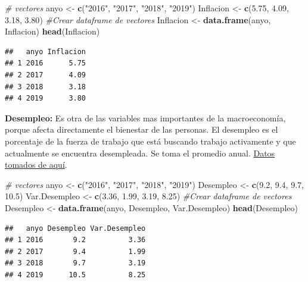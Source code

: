 \documentclass[
  11pt,
  a4paper,
]{book}
\newenvironment{Shaded}{\begin{snugshade}}{\end{snugshade}}
\newcommand{\CommentTok}[1]{\textcolor[rgb]{0.56,0.35,0.01}{\textit{#1}}}
\newcommand{\FloatTok}[1]{\textcolor[rgb]{0.00,0.00,0.81}{#1}}
\newcommand{\KeywordTok}[1]{\textcolor[rgb]{0.13,0.29,0.53}{\textbf{#1}}}
\newcommand{\NormalTok}[1]{#1}
\newcommand{\StringTok}[1]{\textcolor[rgb]{0.31,0.60,0.02}{#1}}
\begin{document}
\begin{Shaded}
\begin{Highlighting}[]
\CommentTok{# vectores }
\NormalTok{anyo <-}\StringTok{ }\KeywordTok{c}\NormalTok{(}\StringTok{"2016"}\NormalTok{, }\StringTok{"2017"}\NormalTok{, }\StringTok{"2018"}\NormalTok{, }\StringTok{"2019"}\NormalTok{)}
\NormalTok{Inflacion <-}\StringTok{ }\KeywordTok{c}\NormalTok{(}\FloatTok{5.75}\NormalTok{, }\FloatTok{4.09}\NormalTok{, }\FloatTok{3.18}\NormalTok{, }\FloatTok{3.80}\NormalTok{)}
\CommentTok{#Crear dataframe de vectores}
\NormalTok{Inflacion <-}\StringTok{ }\KeywordTok{data.frame}\NormalTok{(anyo, Inflacion)}
\KeywordTok{head}\NormalTok{(Inflacion)}
\end{Highlighting}
\end{Shaded}

\begin{verbatim}
##   anyo Inflacion
## 1 2016      5.75
## 2 2017      4.09
## 3 2018      3.18
## 4 2019      3.80
\end{verbatim}

\textbf{Desempleo:} Es otra de las variables mas importantes de la
macroeconomía, porque afecta directamente el bienestar de las personas.
El desempleo es el porcentaje de la fuerza de trabajo que está buscando
trabajo activamente y que actualmente se encuentra desempleada. Se toma
el promedio anual.
\href{https://www.dane.gov.co/index.php/estadisticas-por-tema/mercado-laboral/empleo-y-desempleo}{Datos
tomados de aquí}.

\begin{Shaded}
\begin{Highlighting}[]
\CommentTok{# vectores }
\NormalTok{anyo <-}\StringTok{ }\KeywordTok{c}\NormalTok{(}\StringTok{"2016"}\NormalTok{, }\StringTok{"2017"}\NormalTok{, }\StringTok{"2018"}\NormalTok{, }\StringTok{"2019"}\NormalTok{)}
\NormalTok{Desempleo <-}\StringTok{ }\KeywordTok{c}\NormalTok{(}\FloatTok{9.2}\NormalTok{, }\FloatTok{9.4}\NormalTok{, }\FloatTok{9.7}\NormalTok{, }\FloatTok{10.5}\NormalTok{)}
\NormalTok{Var.Desempleo <-}\StringTok{ }\KeywordTok{c}\NormalTok{(}\FloatTok{3.36}\NormalTok{, }\FloatTok{1.99}\NormalTok{, }\FloatTok{3.19}\NormalTok{, }\FloatTok{8.25}\NormalTok{)}
\CommentTok{#Crear dataframe de vectores}
\NormalTok{Desempleo <-}\StringTok{ }\KeywordTok{data.frame}\NormalTok{(anyo, Desempleo, Var.Desempleo)}
\KeywordTok{head}\NormalTok{(Desempleo)}
\end{Highlighting}
\end{Shaded}

\begin{verbatim}
##   anyo Desempleo Var.Desempleo
## 1 2016       9.2          3.36
## 2 2017       9.4          1.99
## 3 2018       9.7          3.19
## 4 2019      10.5          8.25
\end{verbatim}
\end{document}
